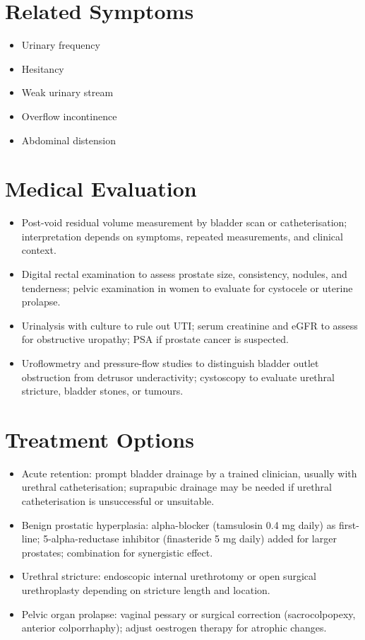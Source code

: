 \section*{Related Symptoms}
\begin{itemize}
  \item Urinary frequency
  \item Hesitancy
  \item Weak urinary stream
  \item Overflow incontinence
  \item Abdominal distension
\end{itemize}

\section*{Medical Evaluation}
\begin{itemize}
  \item Post-void residual volume measurement by bladder scan or catheterisation; interpretation depends on symptoms, repeated measurements, and clinical context.
  \item Digital rectal examination to assess prostate size, consistency, nodules, and tenderness; pelvic examination in women to evaluate for cystocele or uterine prolapse.
  \item Urinalysis with culture to rule out UTI; serum creatinine and eGFR to assess for obstructive uropathy; PSA if prostate cancer is suspected.
  \item Uroflowmetry and pressure-flow studies to distinguish bladder outlet obstruction from detrusor underactivity; cystoscopy to evaluate urethral stricture, bladder stones, or tumours.
\end{itemize}

\section*{Treatment Options}
\begin{itemize}
  \item Acute retention: prompt bladder drainage by a trained clinician, usually with urethral catheterisation; suprapubic drainage may be needed if urethral catheterisation is unsuccessful or unsuitable.
  \item Benign prostatic hyperplasia: alpha-blocker (tamsulosin 0.4 mg daily) as first-line; 5-alpha-reductase inhibitor (finasteride 5 mg daily) added for larger prostates; combination for synergistic effect.
  \item Urethral stricture: endoscopic internal urethrotomy or open surgical urethroplasty depending on stricture length and location.
  \item Pelvic organ prolapse: vaginal pessary or surgical correction (sacrocolpopexy, anterior colporrhaphy); adjust oestrogen therapy for atrophic changes.
\end{itemize}

